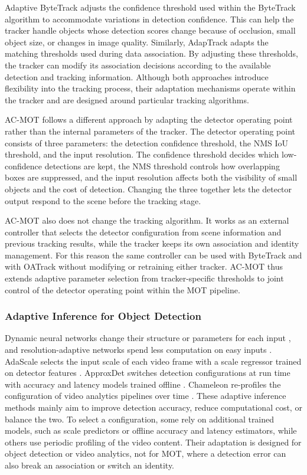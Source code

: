 \documentclass[journal]{new-aiaa}
\begin{document}
Adaptive ByteTrack adjusts the confidence threshold used within the ByteTrack \cite{ma2023adaptivebytetrack} algorithm to accommodate variations in detection confidence. This can help the tracker handle objects whose detection scores change because of occlusion, small object size, or changes in image quality. Similarly, AdapTrack \cite{shim2024adaptrack} adapts the matching thresholds used during data association. By adjusting these thresholds, the tracker can modify its association decisions according to the available detection and tracking information. Although both approaches introduce flexibility into the tracking process, their adaptation mechanisms operate within the tracker and are designed around particular tracking algorithms.

AC-MOT follows a different approach by adapting the detector operating point rather than the internal parameters of the tracker. The detector operating point consists of three parameters: the detection confidence threshold, the NMS IoU threshold, and the input resolution. The confidence threshold decides which low-confidence detections are kept, the NMS threshold controls how overlapping boxes are suppressed, and the input resolution affects both the visibility of small objects and the cost of detection. Changing the three together lets the detector output respond to the scene before the tracking stage.

AC-MOT also does not change the tracking algorithm. It works as an external controller that selects the detector configuration from scene information and previous tracking results, while the tracker keeps its own association and identity management. For this reason the same controller can be used with ByteTrack and with OATrack without modifying or retraining either tracker. AC-MOT thus extends adaptive parameter selection from tracker-specific thresholds to joint control of the detector operating point within the MOT pipeline.

\subsubsection{Adaptive Inference for Object Detection}
Dynamic neural networks change their structure or parameters for each input
\cite{han2022dynamic}, and resolution-adaptive networks spend less computation
on easy inputs \cite{yang2020ranet}. AdaScale selects the input scale of each
video frame with a scale regressor trained on detector features
\cite{chin2019adascale}. ApproxDet switches detection configurations at run
time with accuracy and latency models trained offline \cite{xu2020approxdet}.
Chameleon re-profiles the configuration of video analytics pipelines over time
\cite{jiang2018chameleon}. These adaptive inference methods mainly aim to improve detection accuracy, reduce computational cost, or balance the two. To select a configuration, some rely on additional trained models, such as scale predictors or offline accuracy and latency estimators, while others use periodic profiling of the video content. Their adaptation is designed for object detection or video analytics, not for MOT, where a detection error can also break an association or switch an identity.
\end{document}
